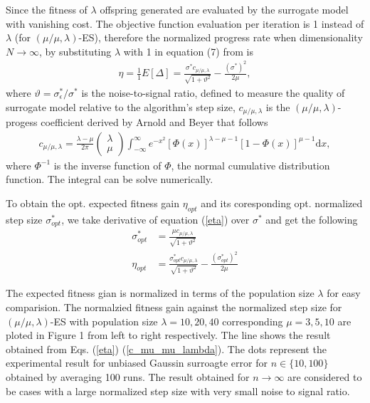 Since the fitness of $\lambda$ offspring generated are evaluated by the surrogate model with vanishing cost. The objective function evaluation per iteration is 1 instead of $\lambda$ (for $(\mu/\mu,\lambda)$-ES), therefore the normalized progress rate when dimensionality $N \rightarrow \infty$, by substituting $\lambda$ with 1 in equation (7) from \cite{ARNOLD2001127} is 
\begin{align}\label{eta}
\eta = \frac{1}{1}E[ \Delta] = \frac{\sigma^* c_{\mu / \mu, \lambda}}{\sqrt {1+ \vartheta^2}} - \frac{(\sigma^*)^2}{2 \mu},
\end{align}
where $\vartheta = \sigma_\epsilon^*/\sigma^*$ is the noise-to-signal ratio, defined to measure the quality of surrogate model relative to the algorithm's step size, $c_{\mu/\mu,\lambda}$ is the $(\mu/\mu,\lambda)$-progess coefficient derived by Arnold and Beyer \cite{Arnold:2000:EMS:645825.669117} that follows
\begin{align}\label{c_mu_mu_lambda}
c_{\mu/\mu,\lambda}  = \frac{\lambda-\mu}{2 \pi} \begin{pmatrix} \lambda \\ \mu \end{pmatrix} \int_{-\infty}^{\infty} e^{-x^2}   \left [ \Phi(x)\right]^{\lambda-\mu-1}  \left[ 1- \Phi (x) \right]^{\mu-1}  \text{d} x,
\end{align}
where $\Phi^{-1}$ is the inverse function of $\Phi$, the normal cumulative distribution function. The integral can be solve numerically.  

To obtain the opt. expected fitness gain $\eta_{opt}$ and its coresponding opt. normalized step size $\sigma^*_{opt}$, we take derivative of equation (\ref{eta}) over $\sigma^*$ and get the following 
\begin{align}\label{opt}
\sigma^*_{opt} &= \frac{ \mu c_{\mu / \mu, \lambda}}{\sqrt {1+ \vartheta^2}}\\
\eta_{opt} &= \frac{\sigma^*_{opt} c_{\mu / \mu, \lambda}}{\sqrt {1+ \vartheta^2}} - \frac{(\sigma^*_{opt})^2}{2 \mu} 
\end{align}

The expected fitness gian is normalized in terms of the population size $\lambda$ for easy comparision. The normalzied fitness gain against the normalized step size for $(\mu/\mu,\lambda)$-ES with population size $\lambda=10,20,40$ corresponding $\mu=3,5,10$ are ploted in Figure 1 from left to right respectively. The line shows the result obtained from Eqs. (\ref{eta}) (\ref{c_mu_mu_lambda}). The dots represent the experimental result for unbiased Gaussin surroagte error for $n \in \{10,100 \}$ obtained by averaging 100 runs. The result obtained for $n \rightarrow \infty$ are considered to be cases with a large normalized step size with very small noise to signal ratio. 

